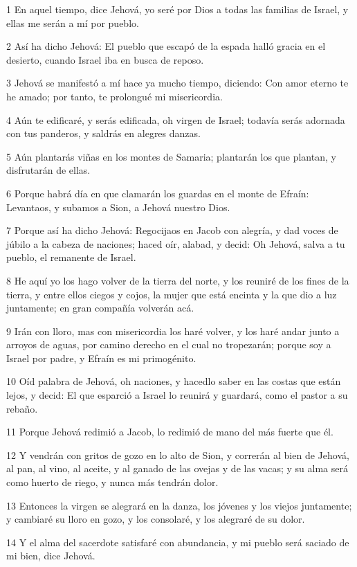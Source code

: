 \par 1 En aquel tiempo, dice Jehová, yo seré por Dios a todas las familias de Israel, y ellas me serán a mí por pueblo.
\par 2 Así ha dicho Jehová: El pueblo que escapó de la espada halló gracia en el desierto, cuando Israel iba en busca de reposo.
\par 3 Jehová se manifestó a mí hace ya mucho tiempo, diciendo: Con amor eterno te he amado; por tanto, te prolongué mi misericordia.
\par 4 Aún te edificaré, y serás edificada, oh virgen de Israel; todavía serás adornada con tus panderos, y saldrás en alegres danzas.
\par 5 Aún plantarás viñas en los montes de Samaria; plantarán los que plantan, y disfrutarán de ellas.
\par 6 Porque habrá día en que clamarán los guardas en el monte de Efraín: Levantaos, y subamos a Sion, a Jehová nuestro Dios.
\par 7 Porque así ha dicho Jehová: Regocijaos en Jacob con alegría, y dad voces de júbilo a la cabeza de naciones; haced oír, alabad, y decid: Oh Jehová, salva a tu pueblo, el remanente de Israel.
\par 8 He aquí yo los hago volver de la tierra del norte, y los reuniré de los fines de la tierra, y entre ellos ciegos y cojos, la mujer que está encinta y la que dio a luz juntamente; en gran compañía volverán acá.
\par 9 Irán con lloro, mas con misericordia los haré volver, y los haré andar junto a arroyos de aguas, por camino derecho en el cual no tropezarán; porque soy a Israel por padre, y Efraín es mi primogénito.
\par 10 Oíd palabra de Jehová, oh naciones, y hacedlo saber en las costas que están lejos, y decid: El que esparció a Israel lo reunirá y guardará, como el pastor a su rebaño.
\par 11 Porque Jehová redimió a Jacob, lo redimió de mano del más fuerte que él.
\par 12 Y vendrán con gritos de gozo en lo alto de Sion, y correrán al bien de Jehová, al pan, al vino, al aceite, y al ganado de las ovejas y de las vacas; y su alma será como huerto de riego, y nunca más tendrán dolor.
\par 13 Entonces la virgen se alegrará en la danza, los jóvenes y los viejos juntamente; y cambiaré su lloro en gozo, y los consolaré, y los alegraré de su dolor.
\par 14 Y el alma del sacerdote satisfaré con abundancia, y mi pueblo será saciado de mi bien, dice Jehová.
